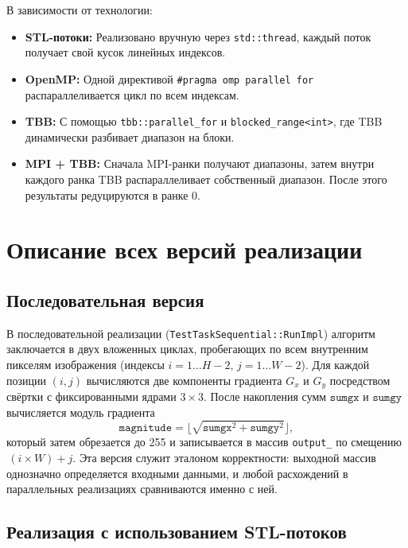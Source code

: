 \documentclass[12pt]{article}
\begin{document}
В зависимости от технологии:
\begin{itemize}
    \item \textbf{STL-потоки:} Реализовано вручную через \texttt{std::thread}, каждый поток получает свой кусок линейных индексов.
    \item \textbf{OpenMP:} Одной директивой \verb|#pragma omp parallel for| распараллеливается цикл по всем индексам.
    \item \textbf{TBB:} С помощью \texttt{tbb::parallel\_for} и \texttt{blocked\_range<int>}, где TBB динамически разбивает диапазон на блоки.
    \item \textbf{MPI + TBB:} Сначала MPI-ранки получают диапазоны, затем внутри каждого ранка TBB распараллеливает собственный диапазон. После этого результаты редуцируются в ранке 0.
\end{itemize}

\section{Описание всех версий реализации}

\subsection{Последовательная версия}

В последовательной реализации (\texttt{TestTaskSequential::RunImpl}) алгоритм заключается в двух вложенных циклах, пробегающих по всем внутренним пикселям изображения (индексы $i=1\ldots H-2$, $j=1\ldots W-2$). Для каждой позиции $(i,j)$ вычисляются две компоненты градиента $G_x$ и $G_y$ посредством свёртки с фиксированными ядрами $3\times3$. После накопления сумм $\texttt{sumgx}$ и $\texttt{sumgy}$ вычисляется модуль градиента
\[
    \texttt{magnitude} = \lfloor \sqrt{\texttt{sumgx}^2 + \texttt{sumgy}^2} \rfloor,
\]
который затем обрезается до 255 и записывается в массив \texttt{output\_} по смещению \(\,(i \times W) + j\). Эта версия служит эталоном корректности: выходной массив однозначно определяется входными данными, и любой расхождений в параллельных реализациях сравниваются именно с ней.

\subsection{Реализация с использованием STL-потоков}
\end{document}
